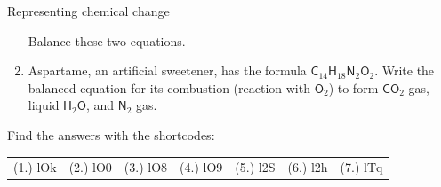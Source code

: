 \begin{eocexercises}{Representing chemical change}
\begin{enumerate}[noitemsep, label=\textbf{\arabic*}. ]
Balance these two equations.
\label{m38727*uid46}\item Aspartame, an artificial sweetener, has the formula ${\mathsf{C}}_{14}{\mathsf{H}}_{18}{\mathsf{N}}_{2}{\mathsf{O}}_{2}$. Write the balanced equation for its combustion (reaction with ${\mathsf{O}}_{2}$) to form ${\mathsf{CO}}_{2}$ gas, liquid $\mathsf{H}_{2}\mathsf{O}$, and ${\mathsf{N}}_{2}$ gas.
\end{enumerate}
  \label{m38727**end}
  \label{337cc49099d6e82169c54b5d0fc3878f**end}
\par {} Find the answers with the shortcodes:
 \par \begin{tabular}[h]{cccccc}
 (1.) lOk  &  (2.) lO0  &  (3.) lO8  &  (4.) lO9  &  (5.) l2S  &  (6.) l2h  &  (7.) lTq  & \end{tabular}
\end{eocexercises}
